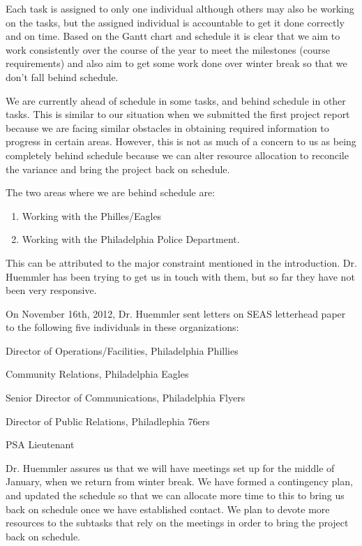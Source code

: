 \documentclass[12pt]{article}
\begin{document}
Each task is assigned to only one individual although others may also
be working on the tasks, but the assigned individual is accountable to
get it done correctly and on time. Based on the Gantt chart and
schedule it is clear that we aim to work consistently over the course
of the year to meet the milestones (course requirements) and also aim
to get some work done over winter break so that we don’t fall behind
schedule.

We are currently ahead of schedule in some tasks, and behind schedule
in other tasks. This is similar to our situation when we submitted the
first project report because we are facing similar obstacles in
obtaining required information to progress in certain areas. However,
this is not as much of a concern to us as being completely behind
schedule because we can alter resource allocation to reconcile the
variance and bring the project back on schedule.

The two areas where we are behind schedule are:

\begin{enumerate}[label=(\emph{\alph*})]
  \item Working with the Philles/Eagles
  \item Working with the Philadelphia Police Department.
\end{enumerate}

This can be attributed to the major constraint mentioned in the
introduction. Dr. Huemmler has been trying to get us in touch with
them, but so far they have not been very responsive.

On November 16th, 2012, Dr. Huemmler sent letters on SEAS letterhead
paper to the following five individuals in these organizations:
\begin{description}[style=nextline]
    \item[Mike DiMuzio]
  Director of Operations/Facilities, Philadelphia Phillies
    \item[Julie Hershey]
  Community Relations, Philadelphia Eagles
    \item[Zach Hill]
  Senior Director of Communications, Philadelphia Flyers
    \item[Michael Preston]
  Director of Public Relations, Philadlephia 76ers
    \item[Lt. John Hewitt]
  PSA Lieutenant
\end{description}

Dr. Huemmler assures us that we will have meetings set up for the
middle of January, when we return from winter break. We have formed a
contingency plan, and updated the schedule so that we can allocate
more time to this to bring us back on schedule once we have
established contact. We plan to devote more resources to the subtasks
that rely on the meetings in order to bring the project back on
schedule.
\end{document}
